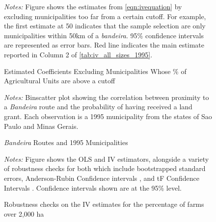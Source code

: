 \documentclass[11pt]{article}
\begin{document}
\clearpage 


\begin{figure}[h!]
  \caption{Estimated Coefficients Excluding Municipalities Whose \% of Agricultural Units are above a cutoff \label{fig:iv_1995_bandeira_dist}}
  \begin{center}
  \end{center}
  \textit{Notes:} Figure shows the estimates from \autoref{eqn:ivequation} by excluding municipalities too far from a certain cutoff. For example, the first estimate at 50 indicates that the sample selection are only municipalities within 50km of a \textit{bandeira}. 95\% confidence intervals are represented as error bars. Red line indicates the main estimate reported in Column 2 of \autoref{tab:iv_all_sizes_1995}.
  \label{fig:iv_robustness_cutoffs}
\end{figure}

\clearpage

\begin{figure}[h!]
    \caption{\textit{Bandeira} Routes and 1995 Municipalities}
    \begin{center}
    \end{center}
    \textit{Notes:} Binscatter plot showing the correlation between proximity to a \textit{Bandeira} route and the probability of having received a land grant. Each observation is a 1995 municipality from the states of Sao Paulo and Minas Gerais.
    \label{fig:bandeira_dist_graph}
  \end{figure}
  
  \clearpage

\begin{figure}
  \caption{Robustness checks on the IV estimates for the percentage of farms over 2,000 ha}
  \begin{center}
  \end{center}
  \textit{Notes:} Figure shows the OLS and IV estimators, alongside a variety of robustness checks for both which include bootstrapped standard errors, Anderson-Rubin Confidence intervals \protect\parencite{Anderson1949-aa}, and tF Confidence Intervals \protect\parencite{Lee2022-jw}. Confidence intervals shown are at the 95\% level.
  \label{fig:ivdiag_1995}
\end{figure}
\end{document}
